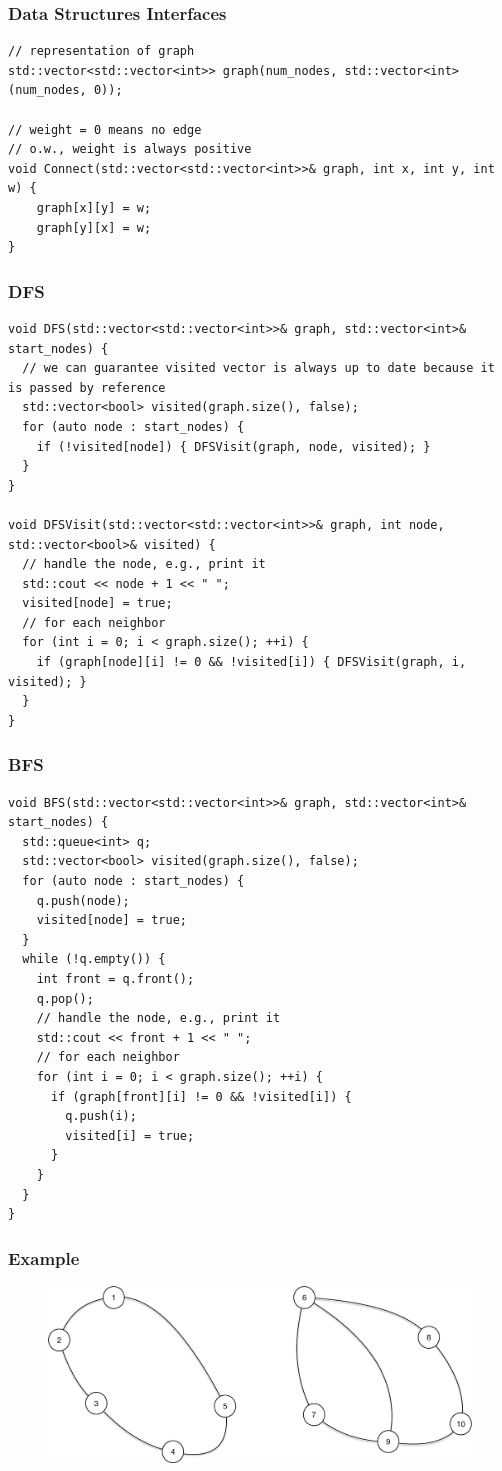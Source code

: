 \subsubsection{Data Structures Interfaces}
\begin{lstlisting}
// representation of graph
std::vector<std::vector<int>> graph(num_nodes, std::vector<int>(num_nodes, 0));

// weight = 0 means no edge
// o.w., weight is always positive
void Connect(std::vector<std::vector<int>>& graph, int x, int y, int w) {
	graph[x][y] = w;
	graph[y][x] = w;
}
\end{lstlisting}

\subsubsection{DFS}
\begin{lstlisting}
void DFS(std::vector<std::vector<int>>& graph, std::vector<int>& start_nodes) {
  // we can guarantee visited vector is always up to date because it is passed by reference
  std::vector<bool> visited(graph.size(), false);
  for (auto node : start_nodes) {
    if (!visited[node]) { DFSVisit(graph, node, visited); }
  }
}

void DFSVisit(std::vector<std::vector<int>>& graph, int node, std::vector<bool>& visited) {
  // handle the node, e.g., print it
  std::cout << node + 1 << " ";
  visited[node] = true;
  // for each neighbor
  for (int i = 0; i < graph.size(); ++i) {
    if (graph[node][i] != 0 && !visited[i]) { DFSVisit(graph, i, visited); }
  }
}
\end{lstlisting}
\subsubsection{BFS}
\begin{lstlisting}
void BFS(std::vector<std::vector<int>>& graph, std::vector<int>& start_nodes) {
  std::queue<int> q;
  std::vector<bool> visited(graph.size(), false);
  for (auto node : start_nodes) {
    q.push(node);
    visited[node] = true;
  }
  while (!q.empty()) {
    int front = q.front();
    q.pop();
    // handle the node, e.g., print it
    std::cout << front + 1 << " ";
    // for each neighbor
    for (int i = 0; i < graph.size(); ++i) {
      if (graph[front][i] != 0 && !visited[i]) {
        q.push(i);
        visited[i] = true;
      }
    }
  }
}
\end{lstlisting}

\subsubsection{Example}
\begin{figure}[H]
\centering
\includegraphics[width=0.7\linewidth]{images/undirected_graph_eg}
\end{figure}

